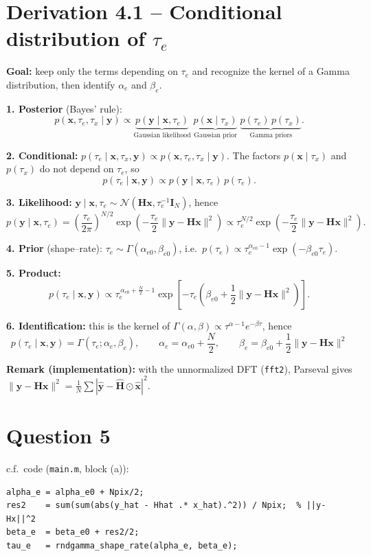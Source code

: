 \documentclass[11pt,a4paper]{article}
\begin{document}
\section*{Derivation 4.1 -- Conditional distribution of $\tau_e$}
\textbf{Goal:} keep only the terms depending on $\tau_e$ and recognize the kernel of a Gamma distribution, then identify $\alpha_e$ and $\beta_e$.

\textbf{1. Posterior} (Bayes' rule):
\[
p(\mathbf x,\tau_e,\tau_x\mid\mathbf y) \propto
\underbrace{p(\mathbf y\mid\mathbf x,\tau_e)}_{\text{Gaussian likelihood}}\;
\underbrace{p(\mathbf x\mid\tau_x)}_{\text{Gaussian prior}}\;
\underbrace{p(\tau_e)\,p(\tau_x)}_{\text{Gamma priors}} .
\]

\textbf{2. Conditional:} $p(\tau_e\mid\mathbf x,\tau_x,\mathbf y)\propto p(\mathbf x,\tau_e,\tau_x\mid\mathbf y)$. The factors $p(\mathbf x\mid\tau_x)$ and $p(\tau_x)$ do not depend on $\tau_e$, so
\[
p(\tau_e\mid\mathbf x,\mathbf y) \propto p(\mathbf y\mid\mathbf x,\tau_e)\,p(\tau_e).
\]

\textbf{3. Likelihood:} $\mathbf y\mid\mathbf x,\tau_e\sim\mathcal N(\mathbf H\mathbf x,\tau_e^{-1}\mathbf I_N)$, hence
\[
p(\mathbf y\mid\mathbf x,\tau_e) = \left(\frac{\tau_e}{2\pi}\right)^{N/2}\exp\!\left(-\frac{\tau_e}{2}\|\mathbf y-\mathbf H\mathbf x\|^2\right)
\propto \tau_e^{N/2}\exp\!\left(-\frac{\tau_e}{2}\|\mathbf y-\mathbf H\mathbf x\|^2\right).
\]

\textbf{4. Prior} (shape--rate): $\tau_e\sim\Gamma(\alpha_{e0},\beta_{e0})$, i.e.\ $p(\tau_e)\propto\tau_e^{\alpha_{e0}-1}\exp(-\beta_{e0}\tau_e)$.

\textbf{5. Product:}
\[
p(\tau_e\mid\mathbf x,\mathbf y) \propto
\tau_e^{\,\alpha_{e0}+\frac N2-1}\exp\!\left[-\tau_e\left(\beta_{e0}+\frac12\|\mathbf y-\mathbf H\mathbf x\|^2\right)\right].
\]

\textbf{6. Identification:} this is the kernel of $\Gamma(\alpha,\beta)\propto\tau^{\alpha-1}e^{-\beta\tau}$, hence
\[
\boxed{\;p(\tau_e\mid\mathbf x,\mathbf y)=\Gamma(\tau_e;\alpha_e,\beta_e),\qquad
\alpha_e=\alpha_{e0}+\frac N2,\qquad
\beta_e=\beta_{e0}+\frac12\|\mathbf y-\mathbf H\mathbf x\|^2\;}
\]

\textbf{Remark (implementation):} with the unnormalized DFT (\texttt{fft2}), Parseval gives
$\|\mathbf y-\mathbf H\mathbf x\|^2=\frac1N\sum|\widehat{\mathbf y}-\widehat{\mathbf H}\odot\widehat{\mathbf x}|^2$.

\section*{Question 5}
c.f.\ code (\texttt{main.m}, block (a)):
\begin{verbatim}
alpha_e = alpha_e0 + Npix/2;
res2    = sum(sum(abs(y_hat - Hhat .* x_hat).^2)) / Npix;  % ||y-Hx||^2
beta_e  = beta_e0 + res2/2;
tau_e   = rndgamma_shape_rate(alpha_e, beta_e);
\end{verbatim}
\end{document}
